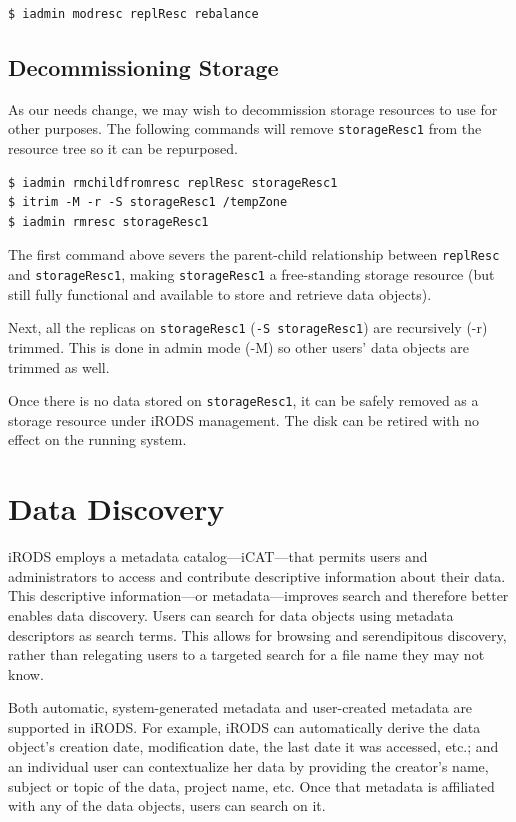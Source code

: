 \documentclass[10pt,oneside]{memoir}
\begin{document}
\begin{lstlisting}
$ iadmin modresc replResc rebalance
\end{lstlisting}

\section{Decommissioning Storage}
As our needs change, we may wish to decommission storage resources to use for other purposes. The following commands will remove \texttt{storageResc1} from the resource tree so it can be repurposed.

\begin{lstlisting}
$ iadmin rmchildfromresc replResc storageResc1
$ itrim -M -r -S storageResc1 /tempZone
$ iadmin rmresc storageResc1
\end{lstlisting}

The first command above severs the parent-child relationship between \texttt{replResc} and \texttt{storageResc1}, making \texttt{storageResc1} a free-standing storage resource (but still fully functional and available to store and retrieve data objects).

Next, all the replicas on \texttt{storageResc1} (\texttt{-S storageResc1}) are recursively (-r) trimmed. This is done in admin mode (-M) so other users' data objects are trimmed as well.

Once there is no data stored on \texttt{storageResc1}, it can be safely removed as a storage resource under iRODS management. The disk can be retired with no effect on the running system.





\chapter{Data Discovery}

iRODS employs a metadata catalog---iCAT---that permits users and administrators to access and contribute descriptive information about their data. This descriptive information---or metadata---improves search and therefore better enables data discovery. Users can search for data objects using metadata descriptors as search terms. This allows for browsing and serendipitous discovery, rather than relegating users to a targeted search for a file name they may not know.

Both automatic, system-generated metadata and user-created metadata are supported in iRODS. For example, iRODS can automatically derive the data object's creation date, modification date, the last date it was accessed, etc.; and an individual user can contextualize her data by providing the creator's name, subject or topic of the data, project name, etc. Once that metadata is affiliated with any of the data objects, users can search on it.
\end{document}
